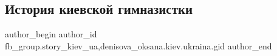  
 
 
 
 
 
\subsection{История киевской гимназистки}
\label{sec:18_02_2021.fb.fb_group.story_kiev_ua.3.gimnazistka}
 
\ifcmt
 author_begin
   author_id fb_group.story_kiev_ua,denisova_oksana.kiev.ukraina.gid
 author_end
\fi

